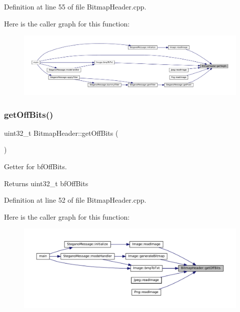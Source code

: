 Definition at line 55 of file Bitmap\+Header.\+cpp.

Here is the caller graph for this function\+:\nopagebreak
\begin{figure}[H]
\begin{center}
\leavevmode
\includegraphics[width=350pt]{classBitmapHeader_a106f72d6c256327342029edf8e18bde1_icgraph}
\end{center}
\end{figure}
\mbox{\label{classBitmapHeader_a70702e4d8aba2a3502f776f73bfecde8}} 
\subsubsection{\texorpdfstring{getOffBits()}{getOffBits()}}
{\footnotesize\ttfamily uint32\+\_\+t Bitmap\+Header\+::get\+Off\+Bits (\begin{DoxyParamCaption}{ }\end{DoxyParamCaption})}



Getter for bf\+Off\+Bits. 

\begin{DoxyReturn}{Returns}
uint32\+\_\+t bf\+Off\+Bits 
\end{DoxyReturn}


Definition at line 52 of file Bitmap\+Header.\+cpp.

Here is the caller graph for this function\+:\nopagebreak
\begin{figure}[H]
\begin{center}
\leavevmode
\includegraphics[width=350pt]{classBitmapHeader_a70702e4d8aba2a3502f776f73bfecde8_icgraph}
\end{center}
\end{figure}
\mbox{\label{classBitmapHeader_a53309aa035484da90e8170f9950aa86b}} 
